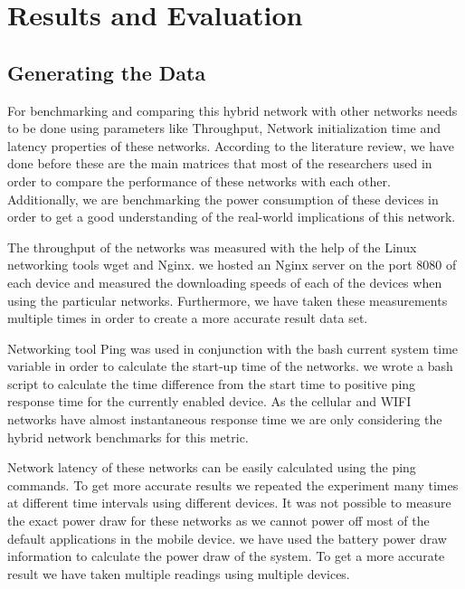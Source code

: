 \chapter[Results and Evaluation]{Results and Evaluation }
\section{Generating the Data}
\vspace{12pt}

For benchmarking and comparing this hybrid network with other networks needs to be done using parameters like Throughput, Network initialization time and latency properties of these networks. According to the literature review, we have done before these are the main matrices that most of the researchers used in order to compare the performance of these networks with each other. Additionally, we are benchmarking the power consumption of these devices in order to get a good understanding of the real-world implications of this network.

\vspace{12pt}
The throughput of the networks was measured with the help of the Linux networking tools wget and Nginx. we hosted an Nginx server on the port 8080 of each device and measured the downloading speeds of each of the devices when using the particular networks. Furthermore, we have taken these measurements multiple times in order to create a more accurate result data set.

\vspace{12pt}
Networking tool Ping was used in conjunction with the bash current system time variable in order to calculate the start-up time of the networks. we wrote a bash script to calculate the time difference from the start time to positive ping response time for the currently enabled device. As the cellular and WIFI networks have almost instantaneous response time we are only considering the hybrid network benchmarks for this metric.

\vspace{12pt}
Network latency of these networks can be easily calculated using the ping commands. To get more accurate results we repeated the experiment many times at different time intervals using different devices.
\clearpage
It was not possible to measure the exact power draw for these networks as we cannot power off most of the default applications in the mobile device. we have used the battery power draw information to calculate the power draw of the system. To get a more accurate result we have taken multiple readings using multiple devices.


